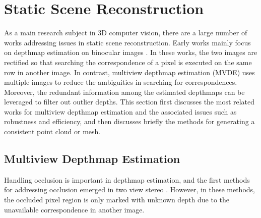 \section{Static Scene Reconstruction}
As a main research subject in 3D computer vision, there are a large number of works addressing issues in static scene reconstruction. Early works mainly focus on depthmap estimation on binocular images \cite{boykov2001fast,Sun_ECCV2002_stereoBeliefProp,scharstein2002taxonomy,scharstein2007learning}. 
In these works, the two images are rectified so that searching the correspondence of a pixel is executed on the same row in another image. In contrast, multiview depthmap estimation (MVDE) uses multiple images to reduce the ambiguities in searching for correspondences. Moreover, the redundant information among the estimated depthmaps can be leveraged to filter out outlier depths. 
This section first discusses the most related works for multiview depthmap estimation and the associated issues such as  robustness and efficiency, and then discusses briefly the methods for generating a consistent point cloud or mesh.

\subsection{Multiview Depthmap Estimation}
Handling occlusion is important in depthmap estimation, and the first methods for addressing occlusion emerged in two view stereo \cite{Sun_ECCV2002_stereoBeliefProp, Sun_CVPR2005_stereo, Xiao:2008}. However, in these methods, the occluded pixel region is only marked with unknown depth due to the unavailable correspondence in another image. 

